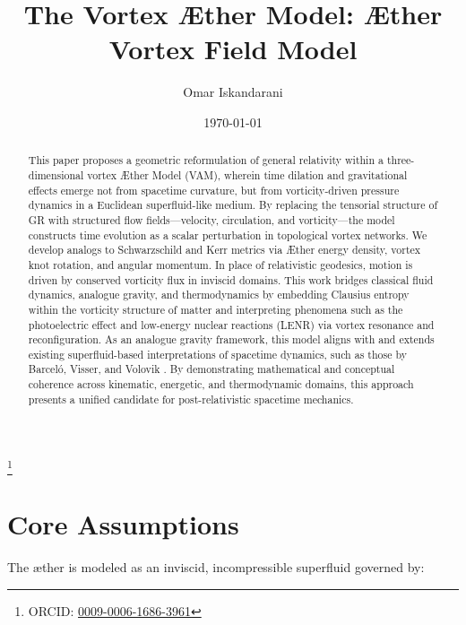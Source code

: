 \documentclass[aps,preprint,superscriptaddress]{revtex4}
\begin{document}
\sloppy %
\author{Omar Iskandarani}
\title{The Vortex Æther Model: Æther Vortex Field Model}
\date{\today}
\thanks{ORCID: \href{https://orcid.org/0009-0006-1686-3961}{0009-0006-1686-3961}}




\begin{abstract}
    This paper proposes a geometric reformulation of general relativity within a three-dimensional vortex Æther Model (VAM), wherein time dilation and gravitational effects emerge not from spacetime curvature, but from vorticity-driven pressure dynamics in a Euclidean superfluid-like medium. By replacing the tensorial structure of GR with structured flow fields—velocity, circulation, and vorticity—the model constructs time evolution as a scalar perturbation in topological vortex networks. We develop analogs to Schwarzschild and Kerr metrics via Æther energy density, vortex knot rotation, and angular momentum. In place of relativistic geodesics, motion is driven by conserved vorticity flux in inviscid domains.
    This work bridges classical fluid dynamics, analogue gravity, and thermodynamics by embedding Clausius entropy within the vorticity structure of matter and interpreting phenomena such as the photoelectric effect and low-energy nuclear reactions (LENR) via vortex resonance and reconfiguration. As an analogue gravity framework, this model aligns with and extends existing superfluid-based interpretations of spacetime dynamics, such as those by Barceló, Visser, and Volovik \cite{barcelo2011analogue, volovik2009universe}. By demonstrating mathematical and conceptual coherence across kinematic, energetic, and thermodynamic domains, this approach presents a unified candidate for post-relativistic spacetime mechanics.
\end{abstract}


\maketitle
    \section*{Core Assumptions}
    The æther is modeled as an inviscid, incompressible superfluid governed by:
\end{document}
